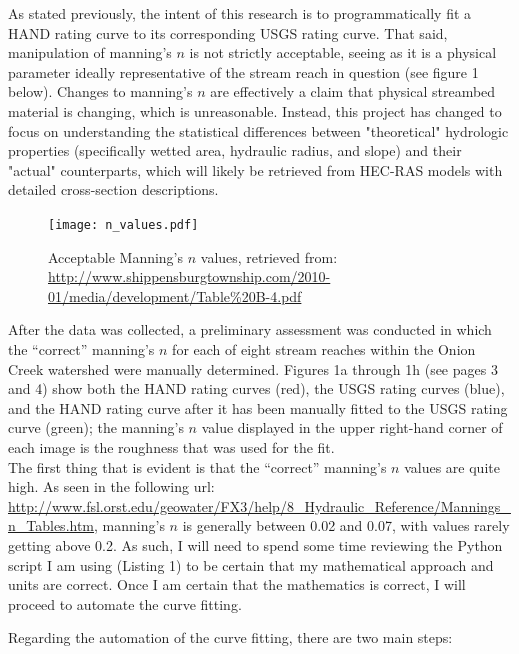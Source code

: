 \documentclass[11pt]{article}
\begin{document}
\clearpage

As stated previously, the intent of this research is to programmatically fit a HAND rating curve to its corresponding USGS rating curve. That said, manipulation of manning's $n$ is not strictly acceptable, seeing as it is a physical parameter ideally representative of the stream reach in question (see figure 1 below). Changes to manning's $n$ are effectively a claim that physical streambed material is changing, which is unreasonable. Instead, this project has changed to focus on understanding the statistical differences between "theoretical" hydrologic properties (specifically wetted area, hydraulic radius, and slope) and their "actual" counterparts, which will likely be retrieved from HEC-RAS models with detailed cross-section descriptions.

\begin{figure}[b!]
\centering
\texttt{[image: n\_values.pdf]}
\caption{Acceptable Manning's $n$ values, retrieved from: \url{http://www.shippensburgtownship.com/2010-01/media/development/Table\%20B-4.pdf}} \label{fig:1}
\end{figure}

After the data was collected, a preliminary assessment was conducted in which the ``correct'' manning's $n$ for each of eight stream reaches within the Onion Creek watershed were manually determined. Figures 1a through 1h (see pages 3 and 4) show both the HAND rating curves (red), the USGS rating curves (blue), and the HAND rating curve after it has been manually fitted to the USGS rating curve (green); the manning's $n$ value displayed in the upper right-hand corner of each image is the roughness that was used for the fit. \\

The first thing that is evident is that the ``correct'' manning's $n$ values are quite high. As seen in the following url: \url{http://www.fsl.orst.edu/geowater/FX3/help/8_Hydraulic_Reference/Mannings_n_Tables.htm}, manning's $n$ is generally between 0.02 and 0.07, with values rarely getting above 0.2. As such, I will need to spend some time reviewing the Python script I am using (Listing 1) to be certain that my mathematical approach and units are correct. Once I am certain that the mathematics is correct, I will proceed to automate the curve fitting. 

\noindent
Regarding the automation of the curve fitting, there are two main steps: 
\end{document}

